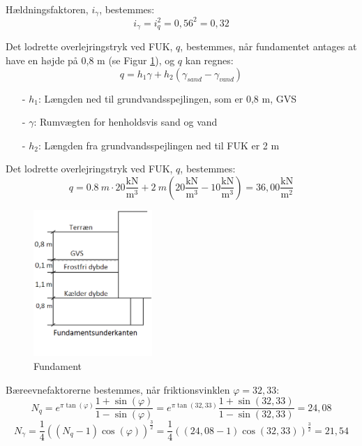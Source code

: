 Hældningsfaktoren, $i_{\gamma}$, bestemmes:
\begin{equation}
	i_{\gamma} = i_q^2 = 0,\!56^2 = 0,\!32
\end{equation}

Det lodrette overlejringstryk ved FUK, $q$, bestemmes, når fundamentet antages at have en højde på 0,8 m (se Figur \ref{fig:hihi}), og $q$ kan regnes:
\begin{equation}
	q = h_1 \gamma + h_2 (\gamma_{sand} - \gamma_{vand})
\end{equation}

\begin{itemize}
	\item[-] $h_1$: Længden ned til grundvandsspejlingen, som er 0,8 m, GVS
	\item[-] $\gamma$: Rumvægten for henholdsvis sand og vand
	\item[-] $h_2$: Længden fra grundvandsspejlingen ned til FUK er 2 m
\end{itemize}

Det lodrette overlejringstryk ved FUK, $q$, bestemmes:
\begin{equation}
	q = \SI{0,8}{m} \cdot 20\frac{\text{kN}}{\text{m}^3} + \SI{2}{m} (20\frac{\text{kN}}{\text{m}^3} - 10\frac{\text{kN}}{\text{m}^3}) = 36,\!00 \frac{\text{kN}}{\text{m}^2}
\end{equation}

\begin{figure}[htbp]
	\centering
	\includegraphics[width=0.4\textwidth]{billeder/fundamentsdybde.png}
	\caption{Fundament}
	\label{fig:hihi}
\end{figure}

Bæreevnefaktorerne bestemmes, når friktionsvinklen $\varphi = 32,\!33$:
\begin{equation}
	N_q = e^{\pi \tan(\varphi)} \frac{1 + \sin(\varphi)}{1 - \sin(\varphi)} = e^{\pi \tan(32,\!33)} \frac{1 + \sin(32,\!33)}{1 - \sin(32,\!33)} = 24,\!08
\end{equation}
\begin{equation}
	N_\gamma = \frac{1}{4}((N_q - 1)\cos(\varphi))^\frac{3}{2} = \frac{1}{4}((24,\!08 - 1)\cos(32,\!33))^\frac{3}{2}=21,\!54
\end{equation}

